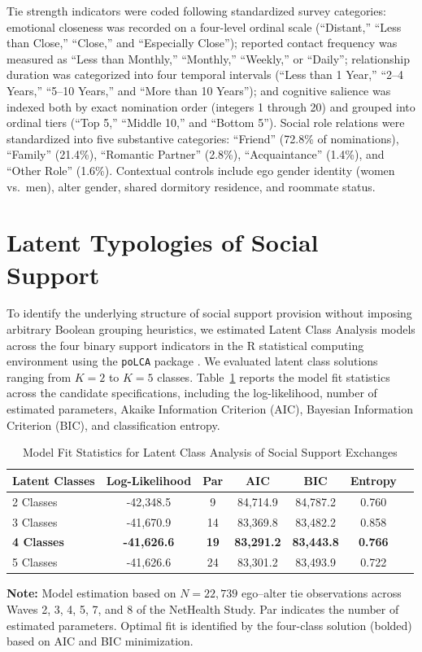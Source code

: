 \documentclass[12pt]{article}
\begin{document}
Tie strength indicators were coded following standardized survey categories: emotional closeness was recorded on a four-level ordinal scale (``Distant,'' ``Less than Close,'' ``Close,'' and ``Especially Close''); reported contact frequency was measured as ``Less than Monthly,'' ``Monthly,'' ``Weekly,'' or ``Daily''; relationship duration was categorized into four temporal intervals (``Less than 1 Year,'' ``2--4 Years,'' ``5--10 Years,'' and ``More than 10 Years''); and cognitive salience was indexed both by exact nomination order (integers 1 through 20) and grouped into ordinal tiers (``Top 5,'' ``Middle 10,'' and ``Bottom 5''). Social role relations were standardized into five substantive categories: ``Friend'' (72.8\% of nominations), ``Family'' (21.4\%), ``Romantic Partner'' (2.8\%), ``Acquaintance'' (1.4\%), and ``Other Role'' (1.6\%). Contextual controls include ego gender identity (women vs.\ men), alter gender, shared dormitory residence, and roommate status.

\section{Latent Typologies of Social Support}

To identify the underlying structure of social support provision without imposing arbitrary Boolean grouping heuristics, we estimated Latent Class Analysis models across the four binary support indicators in the \textsf{R} statistical computing environment \citep{rcore2026r} using the \texttt{poLCA} package \citep{linzer2011polca}. We evaluated latent class solutions ranging from $K = 2$ to $K = 5$ classes. Table~\ref{tab:lca_fit} reports the model fit statistics across the candidate specifications, including the log-likelihood, number of estimated parameters, Akaike Information Criterion (AIC), Bayesian Information Criterion (BIC), and classification entropy.

\begin{table}[htbp]
\centering
\caption{Model Fit Statistics for Latent Class Analysis of Social Support Exchanges}
\label{tab:lca_fit}
\begin{tabular*}{\textwidth}{@{\extracolsep{\fill}}lcccccc@{}}
\toprule
Latent Classes & Log-Likelihood & Par & AIC & BIC & Entropy \\
\midrule
2 Classes & -42,348.5 & 9 & 84,714.9 & 84,787.2 & 0.760 \\
3 Classes & -41,670.9 & 14 & 83,369.8 & 83,482.2 & 0.858 \\
\textbf{4 Classes} & \textbf{-41,626.6} & \textbf{19} & \textbf{83,291.2} & \textbf{83,443.8} & \textbf{0.766} \\
5 Classes & -41,626.6 & 24 & 83,301.2 & 83,493.9 & 0.722 \\
\bottomrule
\end{tabular*}
\vspace{0.5em}
\parbox{\textwidth}{\footnotesize \textbf{Note:} Model estimation based on $N = 22,739$ ego--alter tie observations across Waves 2, 3, 4, 5, 7, and 8 of the NetHealth Study. Par indicates the number of estimated parameters. Optimal fit is identified by the four-class solution (bolded) based on AIC and BIC minimization.}
\end{table}
\end{document}
